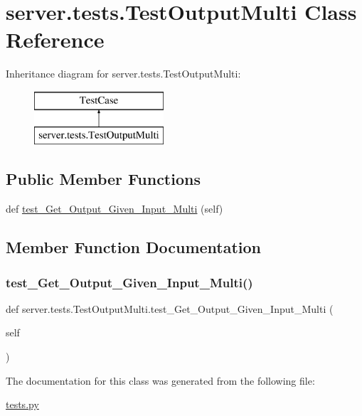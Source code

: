 \hypertarget{classserver_1_1tests_1_1_test_output_multi}{}\section{server.\+tests.\+Test\+Output\+Multi Class Reference}
\label{classserver_1_1tests_1_1_test_output_multi}
Inheritance diagram for server.\+tests.\+Test\+Output\+Multi\+:\begin{figure}[H]
\begin{center}
\leavevmode
\includegraphics[height=2.000000cm]{classserver_1_1tests_1_1_test_output_multi}
\end{center}
\end{figure}
\subsection*{Public Member Functions}
\begin{DoxyCompactItemize}
\item 
def \mbox{\hyperlink{classserver_1_1tests_1_1_test_output_multi_a0006d2af8b81c1f48be9242df7e0dae9}{test\+\_\+\+Get\+\_\+\+Output\+\_\+\+Given\+\_\+\+Input\+\_\+\+Multi}} (self)
\end{DoxyCompactItemize}


\subsection{Member Function Documentation}
\mbox{\label{classserver_1_1tests_1_1_test_output_multi_a0006d2af8b81c1f48be9242df7e0dae9}} 
\subsubsection{\texorpdfstring{test\+\_\+\+Get\+\_\+\+Output\+\_\+\+Given\+\_\+\+Input\+\_\+\+Multi()}{test\_Get\_Output\_Given\_Input\_Multi()}}
{\footnotesize\ttfamily def server.\+tests.\+Test\+Output\+Multi.\+test\+\_\+\+Get\+\_\+\+Output\+\_\+\+Given\+\_\+\+Input\+\_\+\+Multi (\begin{DoxyParamCaption}\item[{}]{self }\end{DoxyParamCaption})}



The documentation for this class was generated from the following file\+:\begin{DoxyCompactItemize}
\item 
\mbox{\hyperlink{tests_8py}{tests.\+py}}\end{DoxyCompactItemize}
